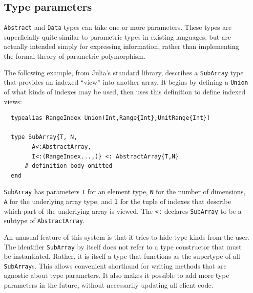 \documentclass[pldi]{sigplanconf-pldi15}
\begin{document}



\subsection{Type parameters}
\label{sec:typeparameters}

\verb|Abstract| and \verb|Data| types can take one or more parameters. These
types are superficially quite similar to parametric types in existing
languages, but are actually intended simply for expressing information, rather
than implementing the formal theory of parametric polymorphism.

The following example, from Julia's standard library, describes a \verb|SubArray|
type that provides an indexed ``view'' into another array. It begins by
defining a \verb|Union| of what kinds of indexes may be used, then uses this
definition to define indexed views:

\begin{lstlisting}
  typealias RangeIndex Union(Int,Range{Int},UnitRange{Int})

  type SubArray{T, N,
		A<:AbstractArray,
		I<:(RangeIndex...,)} <: AbstractArray{T,N}
      # definition body omitted
  end
\end{lstlisting}
%
\verb|SubArray| has parameters \verb|T| for an element type, \verb|N| for the
number of dimensions, \verb|A| for the underlying array type, and \verb|I|
for the tuple of indexes that describe which part of the underlying array
is viewed. The \verb|<:| declares \verb|SubArray| to be a subtype of
\verb|AbstractArray|.

An unusual feature of this system is that it tries to hide type kinds from
the user. The identifier \verb|SubArray| by itself does not refer to a
type constructor that must be instantiated. Rather, it is itself a type
that functions as the supertype of all \verb|SubArray|s. This allows
convenient shorthand for writing methods that are agnostic about type parameters.
It also makes it possible to add more type parameters in the future, without
necessarily updating all client code.
\end{document}
